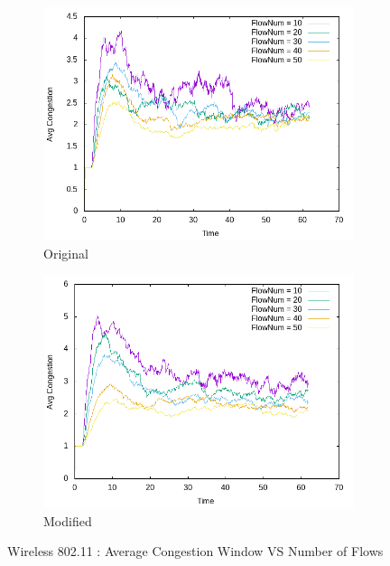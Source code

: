     \begin{figure}[!h] 
    	\centering
    	
    	\begin{subfigure}{0.9\textwidth} %
    		\includegraphics[width=.98\textwidth]{Pictures/Wireless802.11Mobile/Original/Avg_CongestionVSFlowNum.png}
    		 \caption{Original} %
    	\end{subfigure}
    	
    	\vspace{1em} %
    	
    	\begin{subfigure}{0.9\textwidth} %
    		\includegraphics[width=.98\textwidth]{Pictures/Wireless802.11Mobile/Modified/Avg_CongestionVSFlowNum.png}
    		 \caption{ Modified} %
    	\end{subfigure}
    	
    	 \caption{Wireless 802.11 : Average Congestion Window VS Number of Flows} %
    \end{figure}
    
